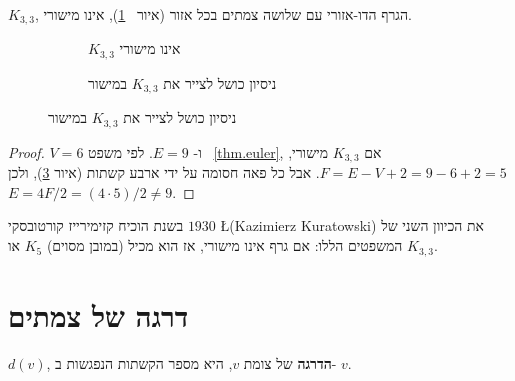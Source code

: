 \begin{theorem}
$K_{3,3}$,
הגרף הדו-אזורי עם שלושה צמתים בכל אזור 
(איור~
\ref{f.five-k33}),
אינו מישורי.
\end{theorem}
\begin{figure}[tb]
\begin{center}
\begin{subfigure}{.4\textwidth}\centering
{}
\caption{$K_{3,3}$ אינו מישורי}\label{f.five-k33}
\end{subfigure}
\hspace{3em}
\begin{subfigure}{.4\textwidth}\centering
{}
\caption{ניסיון כושל לצייר את
$K_{3,3}$
במישור}
\label{f.five-k33-failed}
\end{subfigure}
\end{center}
\end{figure}
\begin{proof}
$V=6$
ו-%
$E=9$.
לפי משפט%
~\ref{thm.euler},
אם
$K_{3,3}$
מישורי,
$F=E-V+2=9-6+2=5$.
אבל כל פאה חסומה על ידי ארבע קשתות
(איור \ref{f.five-k33-failed}),
ולכן
$E=4F/2=(4\cdot 5)/2\neq 9$.
\end{proof}

 בשנת הוכיח קזימירייז קורטובסקי
$1930$
\L{(Kazimierz Kuratowski)}
 את הכיוון השני של המשפטים הללו: אם גרף אינו מישורי, אז הוא מכיל (במובן מסוים) 
$K_5$
או
$K_{3,3}$.


\section{דרגה של צמתים}\label{s.degrees}

\begin{definition}
$d(v)$,
\textbf{הדרגה}
של צומת
$v$,
היא מספר הקשתות הנפגשות ב-%
$v$.
\end{definition}

